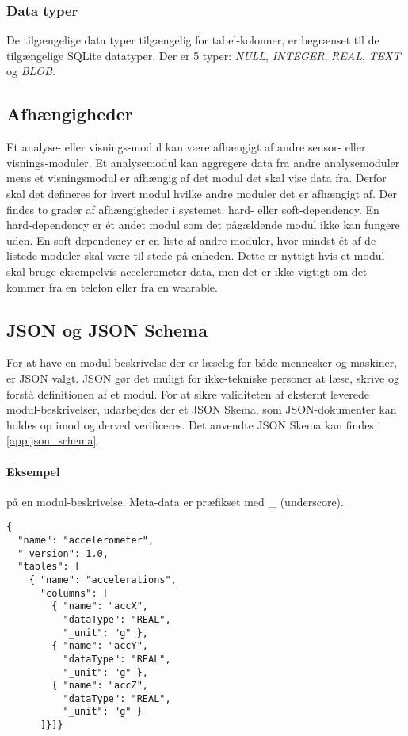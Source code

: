 \subsubsection{Data typer}
De tilgængelige data typer tilgængelig for tabel-kolonner, er begrænset til de tilgængelige SQLite datatyper.
Der er 5 typer: \textit{NULL}, \textit{INTEGER}, \textit{REAL}, \textit{TEXT} og \textit{BLOB}.

\subsection{Afhængigheder}
Et analyse- eller visnings-modul kan være afhængigt af andre sensor- eller visnings-moduler.
Et analysemodul kan aggregere data fra andre analysemoduler mens et visningsmodul er afhængig af det modul det skal vise data fra.
Derfor skal det defineres for hvert modul hvilke andre moduler det er afhængigt af.
Der findes to grader af afhængigheder i systemet: hard- eller soft-dependency.
En hard-dependency er ét andet modul som det pågældende modul ikke kan fungere uden.
En soft-dependency er en liste af andre moduler, hvor mindst ét af de listede moduler skal være til stede på enheden.
Dette er nyttigt hvis et modul skal bruge eksempelvis accelerometer data, men det er ikke vigtigt om det kommer fra en telefon eller fra en wearable.

\subsection{JSON og JSON Schema}
For at have en modul-beskrivelse der er læselig for både mennesker og maskiner, er JSON valgt.
JSON gør det muligt for ikke-tekniske personer at læse, skrive og forstå definitionen af et modul.
For at sikre validiteten af eksternt leverede modul-beskrivelser, udarbejdes der et JSON Skema, som JSON-dokumenter kan holdes op imod og derved verificeres.
Det anvendte JSON Skema kan findes i \cref{app:json_schema}.

\paragraph{Eksempel} på en modul-beskrivelse.
Meta-data er præfikset med \_ (underscore).
\begin{lstlisting}
{
  "name": "accelerometer",
  "_version": 1.0,
  "tables": [
    { "name": "accelerations",
      "columns": [
        { "name": "accX",
          "dataType": "REAL",
          "_unit": "g" },
        { "name": "accY",
          "dataType": "REAL",
          "_unit": "g" },
        { "name": "accZ",
          "dataType": "REAL",
          "_unit": "g" }
      ]}]}
\end{lstlisting}


